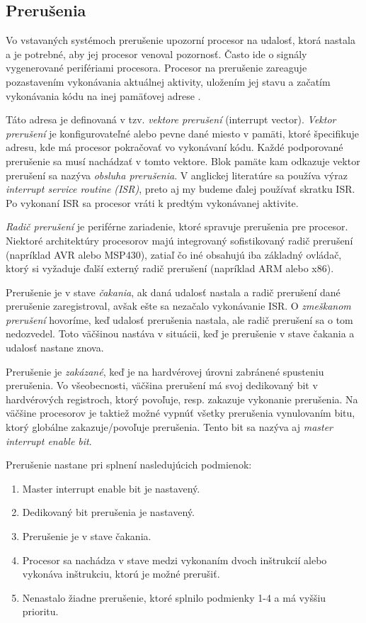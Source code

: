 \subsection{Prerušenia}
\noindent \par
Vo vstavaných systémoch prerušenie upozorní procesor na udalosť, ktorá nastala a je potrebné, aby jej procesor venoval pozornosť.
Často ide o signály vygenerované perifériami procesora. Procesor na prerušenie zareaguje pozastavením vykonávania aktuálnej aktivity, uložením jej stavu a začatím vykonávania kódu na inej pamäťovej adrese \cite{wangAutomaticDetectionValidation2017}. \par
Táto adresa je definovaná v tzv. \textit{vektore prerušení} (interrupt vector). \textit{Vektor prerušení} je konfigurovateľné alebo pevne dané miesto v pamäti,
ktoré špecifikuje adresu, kde má procesor pokračovať vo vykonávaní kódu.
Každé podporované prerušenie sa musí nachádzať v tomto vektore.
Blok pamäte kam odkazuje vektor prerušení sa nazýva \textit{obsluha prerušenia}.
V anglickej literatúre sa používa výraz \textit{interrupt service routine} \textit{(ISR)}, preto aj my budeme ďalej používať skratku  \acrshort{ISR}. Po vykonaní  ISR sa procesor vráti k predtým vykonávanej aktivite. \par
\textit{Radič prerušení} je periférne zariadenie, ktoré spravuje prerušenia pre procesor.
Niektoré architektúry procesorov majú integrovaný sofistikovaný radič prerušení (napríklad AVR alebo MSP430), zatiaľ čo iné obsahujú iba základný ovládač, ktorý si vyžaduje ďalší externý radič prerušení (napríklad ARM alebo x86). \par
Prerušenie je v stave \textit{čakania}, ak daná udalosť nastala a radič prerušení dané prerušenie zaregistroval, avšak ešte sa nezačalo vykonávanie ISR.
O \textit{zmeškanom prerušení} hovoríme, keď udalosť prerušenia nastala, ale radič prerušení sa o tom nedozvedel.
Toto väčšinou nastáva v situácii, keď je prerušenie v stave čakania a udalosť nastane znova. \par
Prerušenie je \textit{zakázané}, keď je na hardvérovej úrovni zabránené spusteniu prerušenia.
Vo všeobecnosti, väčšina prerušení má svoj dedikovaný bit v hardvérových registroch, ktorý povoľuje, resp. zakazuje vykonanie prerušenia.
Na väčšine procesorov je taktiež možné vypnúť všetky prerušenia vynulovaním bitu, ktorý globálne zakazuje/povoľuje prerušenia.
Tento bit sa nazýva aj \textit{master interrupt enable bit}.\par
Prerušenie nastane pri splnení nasledujúcich podmienok:
\begin{enumerate}
    \item Master interrupt enable bit je nastavený.
    \item Dedikovaný bit prerušenia je nastavený.
    \item Prerušenie je v stave čakania.
    \item Procesor sa nachádza v stave medzi vykonaním dvoch inštrukcií alebo vykonáva inštrukciu, ktorú je možné prerušiť.
    \item Nenastalo žiadne prerušenie, ktoré splnilo podmienky 1-4 a má vyššiu prioritu.
\end{enumerate} \par

